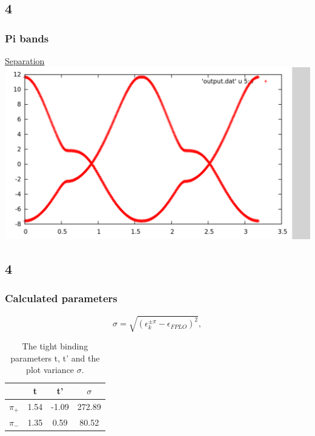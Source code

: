 \documentclass{beamer}
\begin{document}
	\subsection*{4}
		\begin{frame}
			\frametitle{Pi bands}
			\underline{Separation}
			\includegraphics[width=\textwidth]{figures/piPlusMinus.png}	
		\end{frame}
		
	\subsection*{4}
		\begin{frame}
			\frametitle{Calculated parameters}
			\begin{table}[h]
				\centering
				\begin{equation}
					\sigma = \sqrt{\left( \epsilon_{k}^{\pm \pi} - \epsilon_{FPLO} \right)^2},
				\end{equation}
				\vspace{0.4cm}
				\begin{tabular}{cccc}
				     & t & t' & $\sigma$ \\
					\midrule
					 $\pi_+$ & 1.54 & -1.09 & 272.89 \\
					 $\pi_-$ & 1.35 & 0.59 & 80.52 \\
					\bottomrule
				\end{tabular}
				\caption{The tight binding parameters t, t' and the plot variance $\sigma$.}
			\end{table}
		\end{frame}
\end{document}
